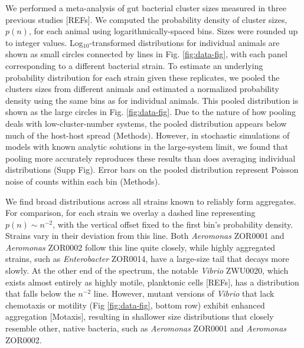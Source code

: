 \documentclass[aps,pre,twocolumn]{revtex4-1}
\begin{document}
We performed a meta-analysis of gut bacterial cluster sizes measured in three previous studies [REFs]. We computed the probability density of cluster sizes, $p(n)$, for each animal using logarithmically-spaced bins. Sizes were rounded up to integer values. Log$_{10}$-transformed distributions for individual animals are shown as small circles connected by lines in Fig. \ref{fig:data-fig}, with each panel corresponding to a different bacterial strain. To estimate an underlying probability distribution for each strain given these replicates, we pooled the clusters sizes from different animals and estimated a normalized probability density using the same bins as for individual animals. This pooled distribution is shown as the large circles in Fig. \ref{fig:data-fig}. Due to the nature of how pooling deals with low-cluster-number systems, the pooled distribution appears below much of the host-host spread (Methods). However, in stochastic simulations of models with known analytic solutions in the large-system limit, we found that pooling more accurately reproduces these results than does averaging individual distributions (Supp Fig). Error bars on the pooled distribution represent Poisson noise of counts within each bin (Methods). 





We find broad distributions across all strains known to reliably form aggregates. For comparison, for each strain we overlay a dashed line representing $p(n) \sim n^{-2}$, with the vertical offset fixed to the first bin’s probability density. Strains vary in their deviation from this line. Both \textit{Aeromonas} ZOR0001 and \textit{Aeromonas} ZOR0002 follow this line quite closely, while highly aggregated strains, such as \textit{Enterobacter} ZOR0014, have a large-size tail that decays more slowly. At the other end of the spectrum, the notable \textit{Vibrio} ZWU0020, which exists almost entirely as highly motile, planktonic cells [REFs], has a distribution that falls below the $n^{-2}$ line. However, mutant versions of \textit{Vibrio} that lack chemotaxis or motility (Fig \ref{fig:data-fig}, bottom row) exhibit enhanced aggregation [Motaxis], resulting in shallower size distributions that closely resemble other, native bacteria, such as \textit{Aeromonas} ZOR0001 and \textit{Aeromonas} ZOR0002.  
\end{document}
